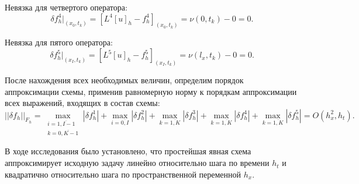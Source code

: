 {{		Невязка для четвертого оператора:
		\begin{equation}
			\delta f^4_h|_{ (x_0, t_k ) } = [L^4[u]_h - f^4_h]_{ (x_0, t_k ) } = \nu(0 , t_k) - 0 = 0\nonumber.
		\end{equation}
		
		Невязка для пятого оператора:
		\begin{equation}
		\delta f^5_h|_{ (x_I, t_k ) } = [L^5[u]_h - f^5_h]_{ (x_I, t_k ) } = \nu(l_x , t_k) - 0 = 0\nonumber.
		\end{equation}
		
		После нахождения всех необходимых величин, определим порядок аппроксимации схемы, применив равномерную норму к порядкам аппроксимации всех выражений, входящих в состав схемы:
		\begin{equation}
			|| \delta f_h ||_{F_h} = \max_{\substack{i = \overline{1, I-1} \\ k = \overline{0, K-1}}} | \delta f^1_h| + \max_{i = \overline{0, I}} | \delta f^2_h| + \max_{k = \overline{1, K}} | \delta f^3_h| +  \max_{k = \overline{1, K}} | \delta f^4_h| +  \max_{k = \overline{1, K}} | \delta f^5_h| = O(h^2_x, h_t).
		\end{equation}
		
		В ходе исследования было установлено, что простейшая явная схема аппроксимирует исходную задачу линейно относительно шага по времени $h_t$ и квадратично относительно шага по пространственной переменной $h_x$. 
		
}}
